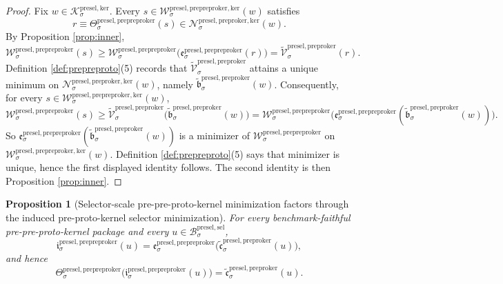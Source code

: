 \documentclass[11pt]{article}
\newcommand{\PreSectionSelectorBody}[1]{\mathcal B_{#1}^{\mathrm{presel,sel}}}
\newcommand{\KernelBody}[1]{\mathcal K_{#1}^{\mathrm{presel,ker}}}
\newcommand{\PreProtoKernelKernelFiber}[2]{\mathcal N_{#1}^{\mathrm{presel,preproker,ker}}(#2)}
\newcommand{\PrePreProtoKernelProj}[1]{\Theta_{#1}^{\mathrm{presel,prepreproker}}}
\newcommand{\PrePreProtoKernelFunctional}[1]{\mathscr W_{#1}^{\mathrm{presel,prepreproker}}}
\newcommand{\PrePreProtoKernelMinLift}[1]{\mathfrak e_{#1}^{\mathrm{presel,prepreproker}}}
\newcommand{\PrePreProtoKernelKernelFiber}[2]{\mathcal W_{#1}^{\mathrm{presel,prepreproker,ker}}(#2)}
\newcommand{\PrePreProtoKernelSelectorMin}[1]{\mathfrak i_{#1}^{\mathrm{presel,prepreproker}}}
\newcommand{\InducedPreProtoKernelFunctional}[1]{\widetilde{\mathscr V}_{#1}^{\mathrm{presel,preproker}}}
\newcommand{\InducedPreProtoKernelKernelMin}[1]{\widetilde{\mathfrak b}_{#1}^{\mathrm{presel,preproker}}}
\newcommand{\InducedPreProtoKernelSelectorMin}[1]{\widetilde{\mathfrak c}_{#1}^{\mathrm{presel,preproker}}}
\newtheorem{proposition}{Proposition}
\begin{document}
\begin{proof}
Fix \(w\in\KernelBody{\sigma}\). Every \(s\in\PrePreProtoKernelKernelFiber{\sigma}{w}\) satisfies
\[
r\equiv\PrePreProtoKernelProj{\sigma}(s)\in\PreProtoKernelKernelFiber{\sigma}{w}.
\]
By Proposition \ref{prop:inner},
\[
\PrePreProtoKernelFunctional{\sigma}(s)
\geq
\PrePreProtoKernelFunctional{\sigma}\bigl(\PrePreProtoKernelMinLift{\sigma}(r)\bigr)
=
\InducedPreProtoKernelFunctional{\sigma}(r).
\]
Definition \ref{def:prepreproto}(5) records that \(\InducedPreProtoKernelFunctional{\sigma}\) attains a unique minimum on \(\PreProtoKernelKernelFiber{\sigma}{w}\), namely \(\InducedPreProtoKernelKernelMin{\sigma}(w)\). Consequently, for every \(s\in\PrePreProtoKernelKernelFiber{\sigma}{w}\),
\[
\PrePreProtoKernelFunctional{\sigma}(s)
\geq
\InducedPreProtoKernelFunctional{\sigma}\bigl(\InducedPreProtoKernelKernelMin{\sigma}(w)\bigr)
=
\PrePreProtoKernelFunctional{\sigma}\bigl(\PrePreProtoKernelMinLift{\sigma}(\InducedPreProtoKernelKernelMin{\sigma}(w))\bigr).
\]
So \(\PrePreProtoKernelMinLift{\sigma}(\InducedPreProtoKernelKernelMin{\sigma}(w))\) is a minimizer of \(\PrePreProtoKernelFunctional{\sigma}\) on \(\PrePreProtoKernelKernelFiber{\sigma}{w}\). Definition \ref{def:prepreproto}(5) says that minimizer is unique, hence the first displayed identity follows. The second identity is then Proposition \ref{prop:inner}.
\end{proof}

\begin{proposition}[Selector-scale pre-pre-proto-kernel minimization factors through the induced pre-proto-kernel selector minimization]
\label{prop:selectorfactor}
For every benchmark-faithful pre-pre-proto-kernel package and every \(u\in\PreSectionSelectorBody{\sigma}\),
\[
\PrePreProtoKernelSelectorMin{\sigma}(u)
=
\PrePreProtoKernelMinLift{\sigma}\bigl(\InducedPreProtoKernelSelectorMin{\sigma}(u)\bigr),
\]
and hence
\[
\PrePreProtoKernelProj{\sigma}\bigl(\PrePreProtoKernelSelectorMin{\sigma}(u)\bigr)
=
\InducedPreProtoKernelSelectorMin{\sigma}(u).
\]
\end{proposition}
\end{document}
